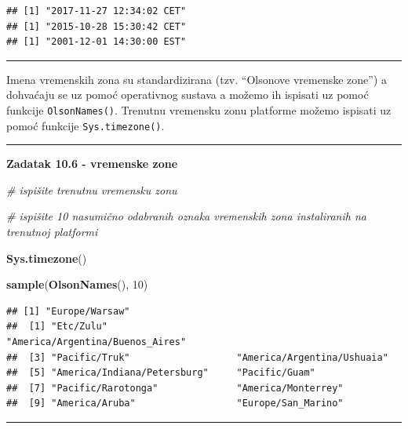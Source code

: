 \documentclass[]{book}
\newenvironment{Shaded}{\begin{snugshade}}{\end{snugshade}}
\newcommand{\KeywordTok}[1]{\textcolor[rgb]{0.13,0.29,0.53}{\textbf{#1}}}
\newcommand{\DecValTok}[1]{\textcolor[rgb]{0.00,0.00,0.81}{#1}}
\newcommand{\CommentTok}[1]{\textcolor[rgb]{0.56,0.35,0.01}{\textit{#1}}}
\newcommand{\NormalTok}[1]{#1}
\theoremstyle{definition}
\theoremstyle{definition}
\theoremstyle{definition}
\theoremstyle{remark}
\begin{document}
\begin{verbatim}
## [1] "2017-11-27 12:34:02 CET"
## [1] "2015-10-28 15:30:42 CET"
## [1] "2001-12-01 14:30:00 EST"
\end{verbatim}

\begin{center}\rule{0.5\linewidth}{\linethickness}\end{center}

Imena vremenskih zona su standardizirana (tzv. ``Olsonove vremenske
zone'') a dohvaćaju se uz pomoć operativnog sustava a možemo ih ispisati
uz pomoć funkcije \texttt{OlsonNames()}. Trenutnu vremensku zonu
platforme možemo ispisati uz pomoć funkcije \texttt{Sys.timezone()}.

\begin{center}\rule{0.5\linewidth}{\linethickness}\end{center}

\textbf{Zadatak 10.6 - vremenske zone}

\begin{Shaded}
\begin{Highlighting}[]
\CommentTok{# ispišite trenutnu vremensku zonu}

\CommentTok{# ispišite 10 nasumično odabranih oznaka vremenskih zona instaliranih na trenutnoj platformi}
\end{Highlighting}
\end{Shaded}

\begin{Shaded}
\begin{Highlighting}[]
\KeywordTok{Sys.timezone}\NormalTok{()}

\KeywordTok{sample}\NormalTok{(}\KeywordTok{OlsonNames}\NormalTok{(), }\DecValTok{10}\NormalTok{)}
\end{Highlighting}
\end{Shaded}

\begin{verbatim}
## [1] "Europe/Warsaw"
##  [1] "Etc/Zulu"                       "America/Argentina/Buenos_Aires"
##  [3] "Pacific/Truk"                   "America/Argentina/Ushuaia"     
##  [5] "America/Indiana/Petersburg"     "Pacific/Guam"                  
##  [7] "Pacific/Rarotonga"              "America/Monterrey"             
##  [9] "America/Aruba"                  "Europe/San_Marino"
\end{verbatim}

\begin{center}\rule{0.5\linewidth}{\linethickness}\end{center}
\end{document}
